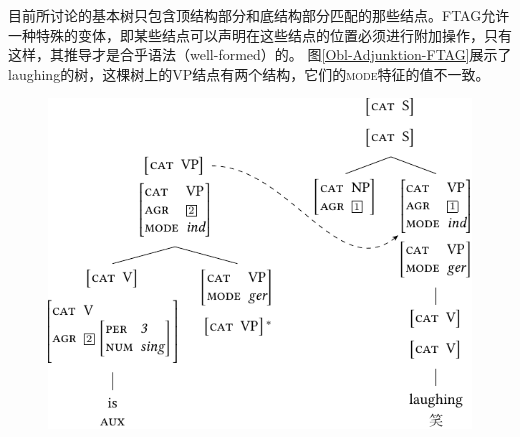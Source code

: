 目前所讨论的基本树只包含顶结构部分和底结构部分匹配的那些结点。FTAG允许一种特殊的变体，即某些结点可以声明在这些结点的位置必须进行附加操作，只有这样，其推导才是合乎语法（well-formed）的。
图\vref{Obl-Adjunktion-FTAG}展示了laughing的树，这棵树上的VP结点有两个结构，它们的\textsc{mode}特征的值不一致。
\begin{figure}
\centerline{%
\includegraphics{Figures/tag-obl-adj-ftag-crop}
}

\end{figure}
